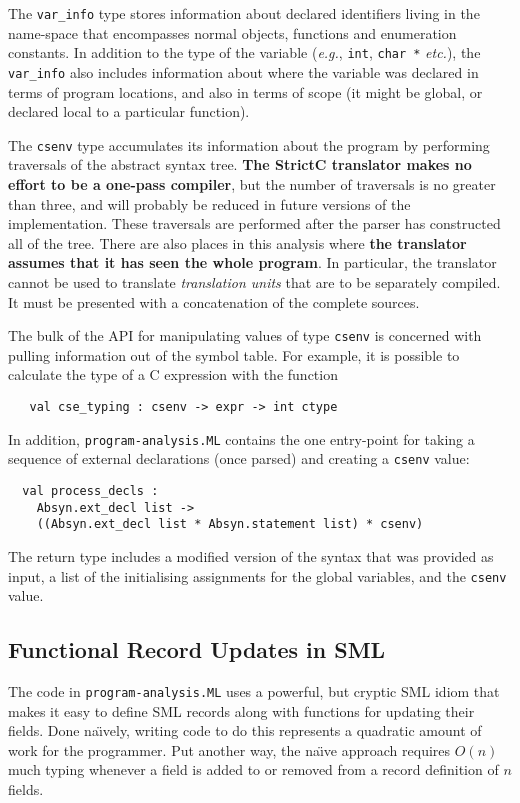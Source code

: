 \documentclass{article}
\newcommand{\strictc}{\textsf{StrictC}}
\newcommand{\MLsuffix}{.ML}
\newcommand{\srcfile}[1]{\texttt{#1}}
\newcommand{\MLfile}[1]{\srcfile{#1\MLsuffix}}
\newcommand{\eg}{\textit{e.g.}}
\newcommand{\etc}{\textit{etc.}}
\newcommand{\naive}[1]{na\"\i{}ve#1}
\begin{document}
The \texttt{var_info} type stores information about declared
identifiers living in the name-space that encompasses normal objects,
functions and enumeration constants.  In addition to the type of the
variable (\eg, \texttt{int}, \texttt{char~*} \etc), the
\texttt{var_info} also includes information about where the variable
was declared in terms of program locations, and also in terms of scope
(it might be global, or declared local to a particular function).

The \texttt{csenv} type accumulates its information about the program
by performing traversals of the abstract syntax tree.  \textbf{The
  \strictc{} translator makes no effort to be a one-pass compiler}, but
the number of traversals is no greater than three, and will probably
be reduced in future versions of the implementation.  These traversals
are performed after the parser has constructed all of the tree.  There
are also places in this analysis where \textbf{the translator assumes
  that it has seen the whole program}.  In particular, the translator
cannot be used to translate \emph{translation units} that are to be
separately compiled.  It must be presented with a concatenation of the
complete sources.

The bulk of the API for manipulating values of type \texttt{csenv} is
concerned with pulling information out of the symbol table.  For
example, it is possible to calculate the type of a C expression with
the function
\begin{verbatim}
   val cse_typing : csenv -> expr -> int ctype
\end{verbatim}

In addition, \MLfile{program-analysis} contains the one entry-point
for taking a sequence of external declarations (once parsed) and
creating a \texttt{csenv} value:
\begin{verbatim}
  val process_decls :
    Absyn.ext_decl list ->
    ((Absyn.ext_decl list * Absyn.statement list) * csenv)
\end{verbatim}
The return type includes a modified version of the syntax that was
provided as input, a list of the initialising assignments for the
global variables, and the \texttt{csenv} value.

\subsection{Functional Record Updates in SML}
\label{sec:fru}

The code in \MLfile{program-analysis} uses a powerful, but cryptic
SML idiom that makes it easy to define SML records along with
functions for updating their fields.  Done \naive{ly}, writing code to
do this represents a quadratic amount of work for the programmer.  Put
another way, the \naive{} approach requires $O(n)$ much typing
whenever a field is added to or removed from a record definition of
$n$ fields.
\end{document}
